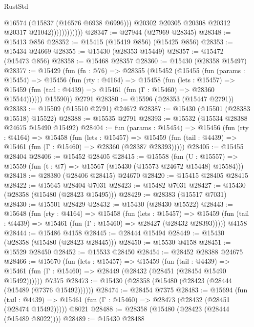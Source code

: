 \begin{lexlean}{RustStd}
\begin{coremodule}
                              @16574
                              (@15837 (@16576 @6938 @6996)))
                            @20302
                            @20305
                            @20308
                            @20312
                            @20317
                            @21042))))))))))))
@28347 := @27944 (@27969 @28345)
@28348 := @15413 @856
@28352 := @15415 (@15419 @856) (@15425 @856)
@28353 := @15434 @24669
@28355 := @15430 (@28353 @15449)
@28357 := @15472 (@15473 @856)
@28358 := @15468 @28357
@28360 := @15430 (@28358 @15497)
@28377 := @15429
    (fun (fn : @76) =>
    @28355
      (@15452
        (@15455
          (fun (params : @15454) =>
          @15456
            (fun (rty : @4164) =>
            @15458
              (fun (lets : @15457) =>
              @15459 (fun (tail : @4439) => @15461 (fun (Γ : @15460) => @28360 @15544))))))
        @15590))
    @2791
@28380 := @15596 (@28353 (@15447 @2791))
@28383 := @15509 (@15510 @2791) @24672
@28387 := @15430 (@15501 (@28383 @15518) @15522)
@28388 := @15535 @2791
@28393 := @15532 (@15534 @28388 @24675 @15490 @15492)
@28404 := fun (params : @15454) =>
  @15456
    (fun (rty : @4164) =>
    @15458
      (fun (lets : @15457) =>
      @15459 (fun (tail : @4439) => @15461 (fun (Γ : @15460) => @28360 (@28387 @28393)))))
@28405 := @15455 @28404
@28406 := @15452 @28405
@28415 := @15558
    (fun (U : @15557) => @15559 (fun (t : @7) => @15567 (@15430 (@15573 @24672 @15448) @15584)))
@28418 := @28380 (@28406 @28415) @24670
@28420 := @15415 @28405 @28415
@28422 := @15645 @28404 @7031
@28423 := @15482 @7031
@28427 := @15430 (@28358 (@15480 (@28423 @15495)))
@28429 := @28383 (@15517 @7031)
@28430 := @15501 @28429
@28432 := @15430 (@28430 @15522)
@28443 := @15648
    (fun (rty : @4164) =>
    @15458
      (fun (lets : @15457) =>
      @15459 (fun (tail : @4439) => @15461 (fun (Γ : @15460) => @28427 (@28432 @28393)))))
    @4158
@28444 := @15486 @4158
@28445 := @28444 @15494
@28449 := @15430 (@28358 (@15480 (@28423 @28445)))
@28450 := @15530 @4158
@28451 := @15529 @28450
@28452 := @15533 @28450
@28454 := @28452 @28388 @24675
@28466 := @15670
    (fun (lets : @15457) =>
    @15459
      (fun (tail : @4439) =>
      @15461 (fun (Γ : @15460) => @28449 (@28432 (@28451 (@28454 @15490 @15492))))))
    @7375
@28473 := @15430 (@28358 (@15480 (@28423 (@28444 (@15489 (@7376 @15492))))))
@28474 := @28454 @7375
@28483 := @15694
    (fun (tail : @4439) => @15461 (fun (Γ : @15460) => @28473 (@28432 (@28451 (@28474 @15492)))))
    @8021
@28488 := @28358 (@15480 (@28423 (@28444 (@15489 @8022))))
@28489 := @15430 @28488

\end{coremodule}
\end{lexlean}
